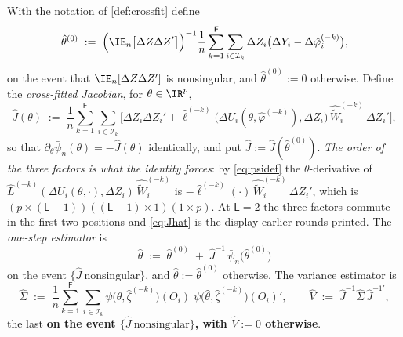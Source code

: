 \begin{definition}\label{def:onestep}
With the notation of \cref{def:crossfit} define
\begin{equation}\label{eq:prelimtheta}
\hat\theta^{(0)}\;:=\;\Big(\IE_n\big[\Delta Z\Delta Z'\big]\Big)^{-1}
\frac1n\sum_{k=1}^{\mathsf F}\sum_{i\in\mathcal I_k}\Delta Z_i\big(\Delta Y_i-\Delta\hat\varphi^{(-k)}_i\big),
\end{equation}
on the event that $\IE_n[\Delta Z\Delta Z']$ is nonsingular, and $\hat\theta^{(0)}:=0$ otherwise. Define
the \emph{cross-fitted Jacobian}, for $\theta\in\IR^{p}$,
\begin{equation}\label{eq:Jhat}
\hat J(\theta)\;:=\;\frac1n\sum_{k=1}^{\mathsf F}\sum_{i\in\mathcal I_k}
\Big[\Delta Z_i\Delta Z_i'+
\hat\ell^{(-k)}\big(\Delta U_i(\theta,\hat\varphi^{(-k)}),\Delta Z_i\big)\,
\widehat{\widetilde W}^{(-k)}_i\,\Delta Z_i'\Big],
\end{equation}
so that $\partial_\theta\bar\psi_n(\theta)=-\hat J(\theta)$ identically, and put
$\hat J:=\hat J(\hat\theta^{(0)})$. \emph{The order of the three factors is what the identity forces}: by
\eqref{eq:psidef} the $\theta$-derivative of $\hat L^{(-k)}(\Delta U_i(\theta,\cdot),\Delta Z_i)\,
\widehat{\widetilde W}^{(-k)}_i$ is $-\hat\ell^{(-k)}(\cdot)\,\widehat{\widetilde W}^{(-k)}_i\,\Delta Z_i'$,
which is $(p\times(\mathsf L-1))((\mathsf L-1)\times1)(1\times p)$. At $\mathsf L=2$ the three factors
commute in the first two positions and \eqref{eq:Jhat} is the display earlier rounds printed.
The \emph{one-step estimator} is
\begin{equation}\label{eq:onestep}
\hat\theta\;:=\;\hat\theta^{(0)}\;+\;\hat J^{-1}\,\bar\psi_n\big(\hat\theta^{(0)}\big)
\end{equation}
on the event $\{\hat J\ \text{nonsingular}\}$, and $\hat\theta:=\hat\theta^{(0)}$ otherwise. The variance
estimator is
\begin{equation}\label{eq:Sighat}
\hat\Sigma\;:=\;\frac1n\sum_{k=1}^{\mathsf F}\sum_{i\in\mathcal I_k}
\psi\big(\hat\theta,\hat\zeta^{(-k)}\big)(O_i)\;\psi\big(\hat\theta,\hat\zeta^{(-k)}\big)(O_i)' ,
\qquad
\hat V\;:=\;\hat J^{-1}\hat\Sigma\,\hat J^{-1\prime} ,
\end{equation}
the last \textbf{on the event $\{\hat J\ \text{nonsingular}\}$, with $\hat V:=0$ otherwise}.

\end{definition}
